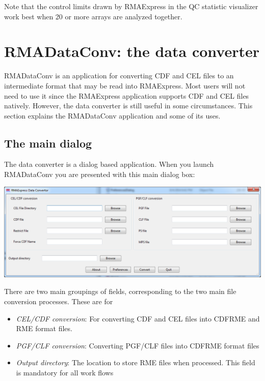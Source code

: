 \documentclass[11pt]{report}
\begin{document}
Note that the control limits drawn by RMAExpress in the QC statistic visualizer work best when 20 or more arrays are analyzed together.


\chapter{RMADataConv: the data converter} \label{chap:RMADataConv}

RMADataConv is an application for converting CDF and CEL files to an intermediate format that may be read into RMAExpress. Most users will not need to use it since the RMAExpress application supports CDF and CEL files natively. However, the data converter is still useful in some circumstances. This section explains the RMADataConv application and some of its uses. %

\section{The main dialog}

The data converter is a dialog based application. When you launch RMADataConv you are presented with this main dialog box: 
\begin{center}
\includegraphics[scale=0.45]{DataConvertor.png}
\end{center}

There are two main groupings of fields, corresponding to the two main file conversion processes. These are for
\begin{itemize}
\item{\it CEL/CDF conversion}: For converting CDF and CEL files into CDFRME and RME format files.
\item{\it PGF/CLF conversion}: Converting PGF/CLF files into CDFRME format files
\end{itemize}

\begin{itemize}
\item {\it Output directory}: The location to store RME files when processed. This field is mandatory for all work flows
\end{itemize}
\end{document}
